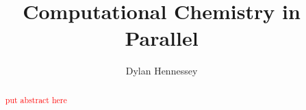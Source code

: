 \documentclass[12pt]{report}
\newcommand{\notetodylan}[1]{\textcolor{red}{#1}} %
\begin{document}

%
%
%
%
%
%
%
%
%
%
%
%
%
%
%
%
%
%
%
%
%
%
%
%
%
%
%
%
%
%
%
%
%
%
%
%
%
%
%
\title{Computational Chemistry in Parallel}
\author{Dylan Hennessey}%
%
%
%
%
%
%
%
%
%
%
%
%
%
%
%
%
%
%
%
%
%
%
%
%
%
%
%
%
%
%
%
%
%
%
%
%
%
%
%

\admin  	%
%
%
%
%
%
%
%
%
%
%
%
%
%
%
%
%
%
%
%
%
%
%
%
%
%
%
%
%
%
%
%
%
%
%
%
%
%
%
%
%
\dedicationpage
\doublespacing		%

\begin{abstract}

\notetodylan{put abstract here}

\end{abstract}%
%
%
%
%
%
%
%
%
%
%
%
%
%
%
%
%
%
%
%
%
%
%
%
%
%
%
%
%
%
%
%
%
%
%
%
%
%
%
%
%
%
%
%
%
%
%
\end{document}
